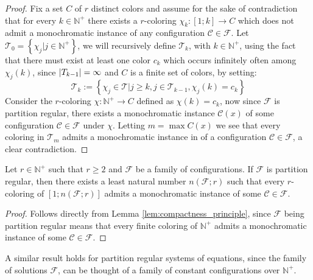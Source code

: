 \begin{proof}
	Fix a set $C$ of $r$ distinct colors and assume for the sake of contradiction that for every $k \in \mathbb{N}^{+}$ there exists a $r$-coloring $\chi_k: [1; k] \to C$ which does not admit a monochromatic instance of any configuration $\mathcal{C} \in \mathcal{F}$.
	Let $\mathcal{T}_0 = \left\{\chi_{j} | j \in \mathbb{N}^{+}\right\}$, we will recursively define $\mathcal{T}_k$, with $k \in \mathbb{N}^{+}$, using the fact that there must exist at least one color $c_{k}$ which occurs infinitely often among $\chi_j(k)$, since $\left\lvert T_{k - 1}\right\rvert = \infty$ and $C$ is a finite set of colors, by setting:
	\begin{equation*}
		\mathcal{T}_{k} := \left\{\chi_j \in \mathcal{T} | j \geq k, j \in \mathcal{T}_{k - 1}, \chi_{j}(k) = c_{k}\right\}
	\end{equation*}
	Consider the $r$-coloring $\chi: \mathbb{N}^{+} \to C$ defined as $\chi(k) = c_{k}$, now since $\mathcal{F}$ is partition regular, there exists a monochromatic instance $\mathcal{C}(x)$ of some configuration $\mathcal{C} \in \mathcal{F}$ under $\chi$. Letting $m = \max C(x)$ we see that every coloring in $\mathcal{T}_{m}$ admits a monochromatic instance in of a configuration $\mathcal{C} \in \mathcal{F}$, a clear contradiction.
\end{proof}

\begin{theorem}\label{thm:compactness_principle}
	Let $r \in \mathbb{N}^+$ such that $r \geq 2$ and $\mathcal{F}$ be a family of configurations. If $\mathcal{F}$ is partition regular, then there exists a least natural number $n(\mathcal{F}; r)$ such that every $r$-coloring of $[1; n(\mathcal{F}; r)]$ admits a monochromatic instance of some $\mathcal{C} \in \mathcal{F}$.
\end{theorem}
\begin{proof}
	Follows directly from Lemma \ref{lem:compactness_principle}, since $\mathcal{F}$ being partition regular means that every finite coloring of $\mathbb{N}^{+}$ admits a monochromatic instance of some $\mathcal{C} \in \mathcal{F}$.
\end{proof}

\begin{remark}
	A similar result holds for partition regular systems of equations, since the family of solutions $\mathcal{F}$, can be thought of a family of constant configurations over $\mathbb{N}^{+}$.
\end{remark}

